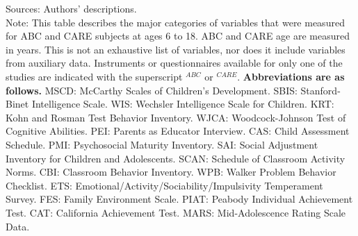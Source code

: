 \documentclass[static]{JJH-Beamer}
\begin{document}
{\flushleft \normalsize Sources: Authors' descriptions. \\
Note: This table describes the major categories of variables that were measured for ABC and CARE subjects at ages 6 to 18. ABC and CARE age are measured in years. This is not an exhaustive list of variables, nor does it include variables from auxiliary data.  Instruments or questionnaires available for only one of the studies are indicated with the superscript $^{ABC}$ or $^{CARE}$. \textbf{Abbreviations are as follows.}  MSCD: McCarthy Scales of Children's Development. SBIS: Stanford-Binet Intelligence Scale. WIS: Wechsler Intelligence Scale for Children. KRT: Kohn and Rosman Test Behavior Inventory. WJCA: Woodcock-Johnson Test of Cognitive Abilities. PEI: Parents as Educator Interview. CAS: Child Assessment Schedule. PMI: Psychosocial Maturity Inventory. SAI: Social Adjustment Inventory for Children and Adolescents. SCAN: Schedule of Classroom Activity Norms. CBI: Classroom Behavior Inventory. WPB: Walker Problem Behavior Checklist. ETS: Emotional/Activity/Sociability/Impulsivity Temperament Survey. FES: Family Environment Scale. PIAT: Peabody Individual Achievement Test. CAT: California Achievement Test. MARS: Mid-Adolescence Rating Scale Data.\\}
\clearpage
\end{document}
